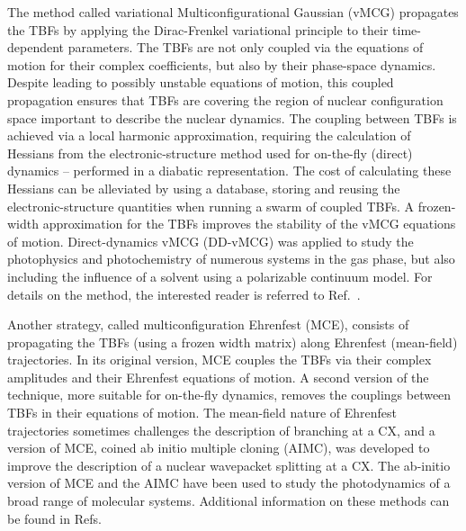 \documentclass[9pt,bestpractices]{livecoms}
\begin{document}
The method called variational Multiconfigurational Gaussian (vMCG) propagates the TBFs by applying the Dirac-Frenkel variational principle to their time-dependent parameters.\cite{worth2004novel,lasorne2006direct,lasorne2007direct,worth2008solving,doi:10.1098/rsta.2020.0386,doi:https://doi.org/10.1002/9781119417774.ch13} The TBFs are not only coupled via the equations of motion for their complex coefficients, but also by their phase-space dynamics. Despite leading to possibly unstable equations of motion, this coupled propagation ensures that TBFs are covering the region of nuclear configuration space important to describe the nuclear dynamics. The coupling between TBFs is achieved via a local harmonic approximation, requiring the calculation of Hessians from the electronic-structure method used for on-the-fly (direct) dynamics -- performed in a diabatic representation. The cost of calculating these Hessians can be alleviated by using a database, storing and reusing the electronic-structure quantities when running a swarm of coupled TBFs.\cite{10.1063/5.0043720} A frozen-width approximation for the TBFs improves the stability of the vMCG equations of motion.\cite{mendive2012towards} Direct-dynamics vMCG (DD-vMCG) was applied to study the photophysics and photochemistry of numerous systems in the gas phase, but also including the influence of a solvent using a polarizable continuum model.\cite{D1CP01843D,molecules26237247} For details on the method, the interested reader is referred to Ref.~.

Another strategy, called multiconfiguration Ehrenfest (MCE), consists of propagating the TBFs (using a frozen width matrix) along Ehrenfest (mean-field) trajectories.\cite{shalashilin2009quantum,shalashilin2010nonadiabatic,saita2012fly} In its original version, MCE couples the TBFs via their complex amplitudes and their Ehrenfest equations of motion. A second version of the technique, more suitable for on-the-fly dynamics, removes the couplings between TBFs in their equations of motion.\cite{SHALASHILIN2024212} The mean-field nature of Ehrenfest trajectories sometimes challenges the description of branching at a CX, and a version of MCE, coined ab initio multiple cloning (AIMC), was developed to improve the description of a nuclear wavepacket splitting at a CX.\cite{makhov2014ab} The ab-initio version of MCE and the AIMC have been used to study the photodynamics of a broad range of molecular systems.\cite{doi:10.1021/acs.jctc.3c00583,Makhov_2022,doi:10.1021/acs.jpclett.1c00266,C8CP06359A,C9CP00039A} Additional information on these methods can be found in Refs.~
\end{document}
